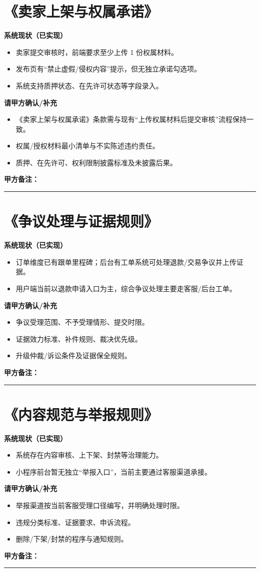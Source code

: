 \documentclass[12pt,a4paper]{ctexart}
\newcommand{\clientnote}{
\vspace{0.3em}
\noindent\textbf{甲方备注：}\par
\vspace{0.3em}
\noindent\rule{\textwidth}{0.4pt}\par
\vspace{1.0em}
}
\begin{document}
\section{《卖家上架与权属承诺》}
\textbf{系统现状（已实现）}
\begin{itemize}
  \item 卖家提交审核时，前端要求至少上传 1 份权属材料。
  \item 发布页有“禁止虚假/侵权内容”提示，但无独立承诺勾选项。
  \item 系统支持质押状态、在先许可状态等字段录入。
\end{itemize}
\textbf{请甲方确认/补充}
\begin{itemize}
  \item 《卖家上架与权属承诺》条款需与现有“上传权属材料后提交审核”流程保持一致。
  \item 权属/授权材料最小清单与不实陈述违约责任。
  \item 质押、在先许可、权利限制披露标准及未披露后果。
\end{itemize}
\clientnote

\section{《争议处理与证据规则》}
\textbf{系统现状（已实现）}
\begin{itemize}
  \item 订单维度已有跟单里程碑；后台有工单系统可处理退款/交易争议并上传证据。
  \item 用户端当前以退款申请入口为主，综合争议处理主要走客服/后台工单。
\end{itemize}
\textbf{请甲方确认/补充}
\begin{itemize}
  \item 争议受理范围、不予受理情形、提交时限。
  \item 证据效力标准、补件规则、裁决优先级。
  \item 升级仲裁/诉讼条件及证据保全规则。
\end{itemize}
\clientnote

\section{《内容规范与举报规则》}
\textbf{系统现状（已实现）}
\begin{itemize}
  \item 系统存在内容审核、上下架、封禁等治理能力。
  \item 小程序前台暂无独立“举报入口”，当前主要通过客服渠道承接。
\end{itemize}
\textbf{请甲方确认/补充}
\begin{itemize}
  \item 举报渠道按当前客服受理口径编写，并明确处理时限。
  \item 违规分类标准、证据要求、申诉流程。
  \item 删除/下架/封禁的程序与通知规则。
\end{itemize}
\clientnote
\end{document}
